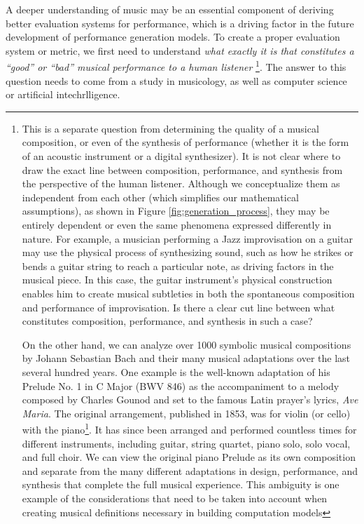 A deeper understanding of music may be an essential component of deriving better evaluation systems for performance, which is a driving factor in the future development of performance generation models. To create a proper evaluation system or metric, we first need to understand \emph{what exactly it is that constitutes a ``good'' or ``bad'' musical performance to a human listener}%
\footnote{This is a separate question from determining the quality of a musical composition, or even of the synthesis of performance (whether it is the form of an acoustic instrument or a digital synthesizer). It is not clear where to draw the exact line between composition, performance, and synthesis from the perspective of the human listener. Although we conceptualize them as independent from each other (which simplifies our mathematical assumptions), as shown in Figure \ref{fig:generation_process}, they may be entirely dependent or even the same phenomena expressed differently in nature. For example, a musician performing a Jazz improvisation on a guitar may use the physical process of synthesizing sound, such as how he strikes or bends a guitar string to reach a particular note, as driving factors in the musical piece. In this case, the guitar instrument's physical construction enables him to create musical subtleties in both the spontaneous composition and performance of improvisation. Is there a clear cut line between what constitutes composition, performance, and synthesis in such a case?

On the other hand, we can analyze over 1000 symbolic musical compositions by Johann Sebastian Bach and their many musical adaptations over the last several hundred years. One example is the well-known adaptation of his Prelude No. 1 in C Major (BWV 846) as the accompaniment to a melody composed by Charles Gounod and set to the famous Latin prayer's lyrics, \emph{Ave Maria}. The original arrangement, published in 1853, was for violin (or cello) with the piano\footnote{For an example performance, look \href{https://www.youtube.com/watch?v=hyUhEjtlDLA&ab_channel=YoYoMaVEVO}{here} for a recent performance by the well-known cellist, Yo-Yo Ma}. It has since been arranged and performed countless times for different instruments, including guitar, string quartet, piano solo, solo vocal, and full choir. We can view the original piano Prelude as its own composition and separate from the many different adaptations in design, performance, and synthesis that complete the full musical experience. This ambiguity is one example of the considerations that need to be taken into account when creating musical definitions necessary in building computation models}. The answer to this question needs to come from a study in musicology, as well as computer science or artificial intechrlligence. 

